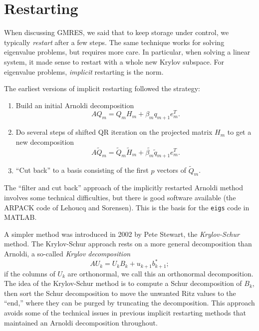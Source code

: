 \section{Restarting}

When discussing GMRES, we said that to keep storage under control,
we typically {\em restart} after a few steps.  The same technique
works for solving eigenvalue problems, but requires more care.
In particular, when solving a linear system, it made sense to restart
with a whole new Krylov subspace.  For eigenvalue problems,
{\em implicit} restarting is the norm.

The earliest versions of implicit restarting followed the strategy:
\begin{enumerate}
\item
  Build an initial Arnoldi decomposition
  \[
    A Q_m = Q_m H_m + \beta_m q_{m+1} e_m^T.
  \]
\item
  Do several steps of shifted QR iteration on the projected matrix
  $H_m$ to get a new decomposition
  \[
    A \tilde{Q}_m =
    \tilde{Q}_m \tilde{H}_m + \tilde{\beta_m} \tilde{q}_{m+1} e_m^T.
  \]
\item
  ``Cut back'' to a basis consisting of the first $p$ vectors
  of $\tilde{Q}_m$.
\end{enumerate}
The ``filter and cut back'' approach of the implicitly restarted
Arnoldi method involves some technical difficulties, but there is
good software available (the ARPACK code of Lehoucq and Sorensen).
This is the basis for the {\tt eigs} code in MATLAB.

A simpler method was introduced in 2002 by Pete Stewart,
the {\em Krylov-Schur} method.  The Krylov-Schur approach rests on
a more general decomposition than Arnoldi, a so-called {\em Krylov
decomposition}
\[
  A U_k = U_k B_k + u_{k+1} b_{k+1}^*;
\]
if the columns of $U_k$ are orthonormal, we call this an orthonormal
decomposition.  The idea of the Krylov-Schur method is to compute a
Schur decomposition of $B_k$, then sort the Schur decomposition to move
the unwanted Ritz values to the ``end,'' where they can be purged
by truncating the decomposition.  This approach avoids some of the
technical issues in previous implicit restarting methods that maintained
an Arnoldi decomposition throughout.
